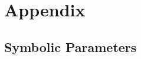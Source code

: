 \documentclass[12pt, titlepage]{article}
\begin{document}


					
					
					
					
					

					
					
					
					





				




\newpage

\section{Appendix}


\subsection{Symbolic Parameters}
\end{document}
